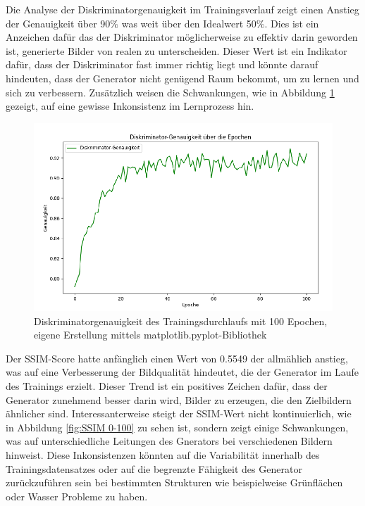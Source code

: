 Die Analyse der Diskriminatorgenauigkeit im Trainingsverlauf zeigt einen Anstieg der Genauigkeit über 90$\%$ was weit über den Idealwert 50$\%$. Dies ist ein Anzeichen dafür das der Diskriminator möglicherweise zu effektiv darin geworden ist, generierte Bilder von realen zu unterscheiden. Dieser Wert ist ein Indikator dafür, dass der Diskriminator fast immer richtig liegt und könnte darauf hindeuten, dass der Generator nicht genügend Raum bekommt, um zu lernen und sich zu verbessern. Zusätzlich weisen die Schwankungen, wie in Abbildung \ref{fig:Genauigkeit 0-100} gezeigt, auf eine gewisse Inkonsistenz im Lernprozess hin.
\begin{figure}[h]
	\centering
	\includegraphics[width=1.0\textwidth]{images/Pix2PixResults/Genauigkeit0-100.png}
	\caption{Diskriminatorgenauigkeit des Trainingsdurchlaufs mit 100 Epochen, eigene Erstellung mittels matplotlib.pyplot-Bibliothek }
	\label{fig:Genauigkeit 0-100}
\end{figure}
 \newpage
Der SSIM-Score hatte anfänglich einen Wert von 0.5549 der allmählich anstieg, was auf eine Verbesserung der Bildqualität hindeutet, die der Generator im Laufe des Trainings erzielt. Dieser Trend ist ein positives Zeichen dafür, dass der Generator zunehmend besser darin wird, Bilder zu erzeugen, die den Zielbildern ähnlicher sind. Interessanterweise steigt der SSIM-Wert nicht kontinuierlich, wie in Abbildung \ref{fig:SSIM 0-100} zu sehen ist, sondern zeigt einige Schwankungen, was auf unterschiedliche Leitungen des Gnerators bei verschiedenen Bildern hinweist. Diese Inkonsistenzen könnten auf die Variabilität innerhalb des Trainingsdatensatzes oder auf die begrenzte Fähigkeit des Generator zurückzuführen sein bei bestimmten Strukturen wie beispielweise Grünflächen oder Wasser Probleme zu haben.\newline
